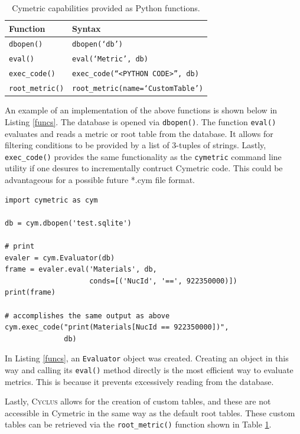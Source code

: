 \documentclass{anstrans}
\newcommand{\cyclus}{\textsc{Cyclus}\xspace}
\newcommand{\code}[1]{{\color{code}\texttt{#1}}}
\begin{document}
\begin{table}[htb]
\centering
\caption{Cymetric capabilities provided as Python functions.}
\begin{tabular}{ll}
\toprule
  Function           & Syntax                 \\
\midrule 
  \code{dbopen()}    & \code{dbopen(`db')}         \\
  \code{eval()}      & \code{eval(`Metric', db)}   \\
  \code{exec\_code()} & \code{exec\_code(``<PYTHON CODE>'', db)}  \\ 
  \code{root\_metric()} & \code{root\_metric(name=`CustomTable')}  \\
\bottomrule
\end{tabular}
\label{tab:pyfunc}
\end{table} 

An example of an implementation of the above functions is shown below in 
Listing \ref{funcs}. The database is opened via \code{dbopen()}. The 
function \code{eval()} evaluates and reads a metric or root table from the 
database. It allows for filtering conditions to be provided by a list of 
3-tuples of strings. 
Lastly, \code{exec\_code()} provides the same functionality as the
\code{cymetric} command line utility if one desures to incrementally contruct Cymetric code. This could be advantageous for a possible future *.cym file format.

\begin{lstlisting}[caption ={Example Python Script Using Cymetric}, label=funcs]
import cymetric as cym

db = cym.dbopen('test.sqlite')

# print 
evaler = cym.Evaluator(db)
frame = evaler.eval('Materials', db, 
                    conds=[('NucId', '==', 922350000)])
print(frame)

# accomplishes the same output as above
cym.exec_code("print(Materials[NucId == 922350000])", 
              db)
\end{lstlisting}

In Listing \ref{funcs}, an \code{Evaluator} object was created. 
Creating an object in this way and calling its \code{eval()} method directly 
is the most efficient way to evaluate metrics. This is because
it prevents excessively reading from the database.

Lastly, \cyclus allows for the creation of custom tables, and these are not accessible in Cymetric in the same way as the default root tables. These custom tables can be retrieved via the \code{root\_metric()} function shown in Table \ref{tab:pyfunc}.
\end{document}
